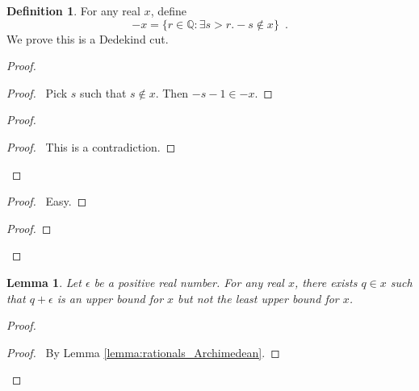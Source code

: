 \documentclass{article}
\let\qed\relax
\newtheorem{lemma}[axiom]{Lemma}
\theoremstyle{definition}
\newtheorem{definition}[axiom]{Definition}
\begin{document}
    \begin{definition}
        For any real $x$, define
        \[ - x = \{ r \in \mathbb{Q} : \exists s > r. -s \notin x \} \enspace . \]
        We prove this is a Dedekind cut.
    \end{definition}

    \begin{proof}
        \pf
        \begin{proof}
            \pf\ Pick $s$ such that $s \notin x$. Then $-s-1 \in -x$.
        \end{proof}
        \begin{proof}
            \qedstep
            \begin{proof}
                \pf\ This is a contradiction.
            \end{proof}
        \end{proof}
        \begin{proof}
            \pf\ Easy.
        \end{proof}
        \begin{proof}
        \end{proof}
        \qed
    \end{proof}

    \begin{lemma}
        \label{lemma:reals_pre_negation}
        Let $\epsilon$ be a positive real number. For any real $x$, there exists $q \in x$
        such that $q + \epsilon$ is an upper bound for $x$ but not the least upper bound for $x$.
    \end{lemma}

    \begin{proof}
        \pf
        \begin{proof}
            \pf\ By Lemma \ref{lemma:rationals_Archimedean}.
        \end{proof}
        \qed
    \end{proof}
\end{document}
